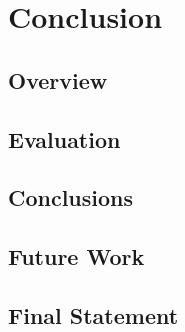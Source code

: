\chapter{Conclusion}
\section{Overview}
\section{Evaluation}
\section{Conclusions}
\section{Future Work}
\section{Final Statement}